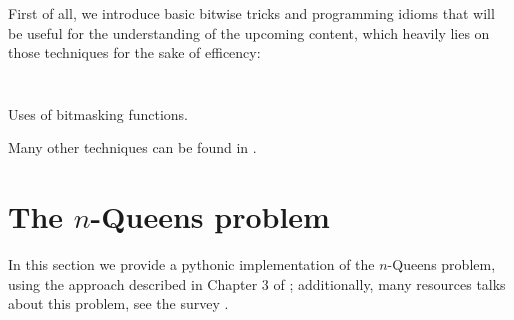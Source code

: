 

First of all, we introduce basic bitwise tricks and programming idioms that
will be useful for the understanding of the upcoming content, which heavily lies
on those techniques for the sake of efficency:
\inputminted[fontsize=\small,stripnl=false]{python}{backtracking/bits_clean.py}
\begin{margintable}[-3cm]
\inputminted[fontsize=\footnotesize,stripnl=false]{python}{backtracking/bits_clean_test.py}
\caption{Uses of bitmasking functions.}
\end{margintable}
Many other techniques can be found in \citep{Warren:2012:HD:2462741}.


\section{The $n$-Queens problem}

In this section we provide a pythonic implementation of the $n$-Queens problem,
using the approach described in Chapter $3$ of \citep{RuskeyCombGen}; additionally,
many resources talks about this problem, see the survey \citep{BELL20091}.

